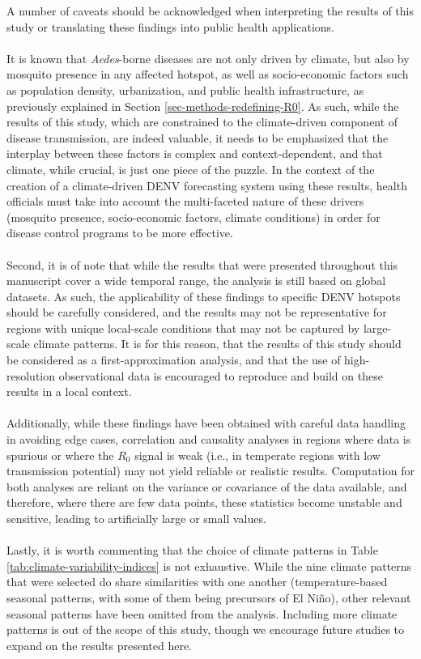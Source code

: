 \documentclass[10pt,twocolumn]{wlscirep}
\begin{document}
A number of caveats should be acknowledged when interpreting the results of this study or translating these findings into public health applications.
\\
\\
It is known that \textit{Aedes}-borne diseases are not only driven by climate, but also by mosquito presence in any affected hotspot, as well as socio-economic factors such as population density, urbanization, and public health infrastructure, as previously explained in Section \ref{sec-methods-redefining-R0}. As such, while the results of this study, which are constrained to the climate-driven component of disease transmission, are indeed valuable, it needs to be emphasized that the interplay between these factors is complex and context-dependent, and that climate, while crucial, is just one piece of the puzzle. In the context of the creation of a climate-driven DENV forecasting system using these results, health officials must take into account the multi-faceted nature of these drivers (mosquito presence, socio-economic factors, climate conditions) in order for disease control programs to be more effective.
\\
\\
Second, it is of note that while the results that were presented throughout this manuscript cover a wide temporal range, the analysis is still based on global datasets. As such, the applicability of these findings to specific DENV hotspots should be carefully considered, and the results may not be representative for regions with unique local-scale conditions that may not be captured by large-scale climate patterns. It is for this reason, that the results of this study should be considered as a first-approximation analysis, and that the use of high-resolution observational data is encouraged to reproduce and build on these results in a local context.
\\
\\
Additionally, while these findings have been obtained with careful data handling in avoiding edge cases, correlation and causality analyses in regions where data is spurious or where the $R_0$ signal is weak (i.e., in temperate regions with low transmission potential) may not yield reliable or realistic results. Computation for both analyses are reliant on the variance or covariance of the data available, and therefore, where there are few data points, these statistics become unstable and sensitive, leading to artificially large or small values.
\\
\\
Lastly, it is worth commenting that the choice of climate patterns in Table \ref{tab:climate-variability-indices} is not exhaustive. While the nine climate patterns that were selected do share similarities with one another (temperature-based seasonal patterns, with some of them being precursors of El Niño), other relevant seasonal patterns have been omitted from the analysis. Including more climate patterns is out of the scope of this study, though we encourage future studies to expand on the results presented here.
\end{document}
